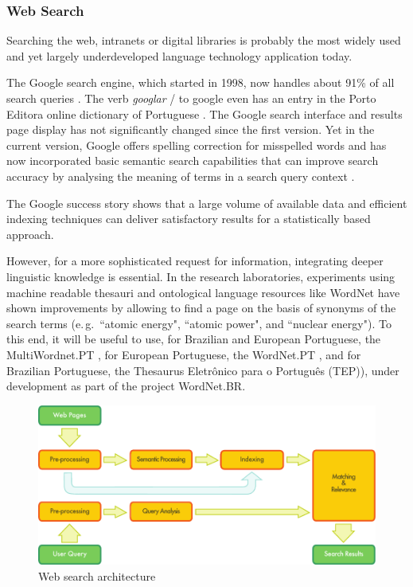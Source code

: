 \begin{multicols}{2}
\subsubsection{Web Search}


Searching the web, intranets or digital libraries is probably the most widely used and yet largely underdeveloped language technology application today. 

The Google search engine, which started in 1998, now handles about 91\% of all search queries \cite{spi1}. 
The verb \textit{googlar} / to google even has an entry in the Porto E\-di\-to\-ra online dictionary of Portuguese \cite{portoeditoraonline}. 
The Google search interface and results page display has not significantly changed since the first version. 
Yet in the current version, Google offers spelling correction for misspelled words and has now incorporated basic semantic search capabilities that can improve search accuracy by analysing the meaning of terms in a search query context \cite{pc1}. 

The Google success story shows that a large volume of available data and efficient indexing techniques can deliver satisfactory results for a statistically based approach.   

 However, for a more sophisticated request for information, integrating deeper linguistic knowledge is essential. In the research laboratories, experiments using machine
readable thesauri and ontological language resources like WordNet have shown improvements by allowing to find a page on the basis of synonyms of the search terms (e.\,g.~“atomic energy", “atomic power", and “nuclear energy"). To this end, 
it will be useful to use, for Brazilian and European Portuguese, the MultiWordnet.PT \cite{multiwordnet}, for European Portuguese, the WordNet.PT \cite{wordnetpt},
and for Brazilian Portuguese, the Thesaurus Eletrônico para o Português (TEP)),  under development as part of the project WordNet.BR.


\begin{figure}[htb]
  \center
  \includegraphics[width=\textwidth]{../_media/english/web_search_architecture}
  \caption{Web search architecture}
  \label{fig:websearcharch_en}
 \end{figure}



\end{multicols}
